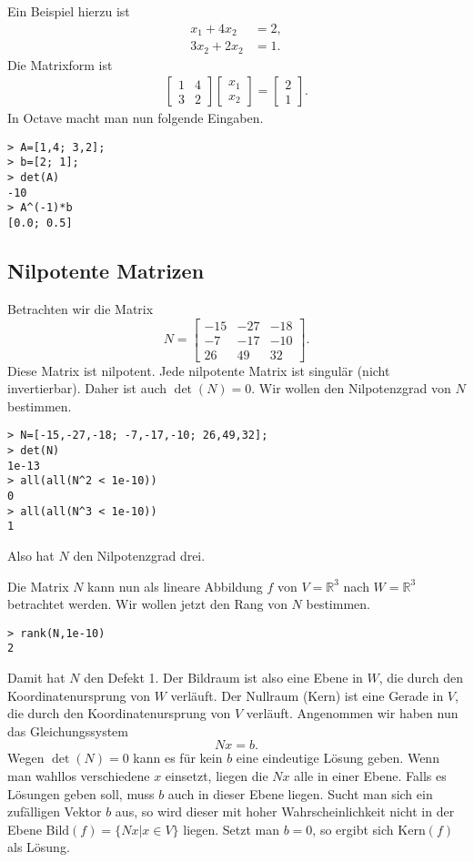 \documentclass[a4paper,11pt,fleqn,twocolumn,twoside,dvipdfmx]{scrartcl}
\begin{document}
Ein Beispiel hierzu ist
\begin{align*}
x_1+4x_2 &= 2,\\
3x_2+2x_2 &=1.
\end{align*}
Die Matrixform ist
\begin{gather*}
\begin{bmatrix}
1 & 4\\
3 & 2
\end{bmatrix}
\begin{bmatrix}
x_1\\ x_2
\end{bmatrix}
= \begin{bmatrix}
2\\ 1
\end{bmatrix}.
\end{gather*}
In Octave macht man nun folgende Eingaben.
\begin{verbatim}
> A=[1,4; 3,2];
> b=[2; 1];
> det(A)
-10
> A^(-1)*b
[0.0; 0.5]
\end{verbatim}

\subsection{Nilpotente Matrizen}

Betrachten wir die Matrix
\[N=\begin{bmatrix}
-15 & -27 & -18\\
 -7 & -17 & -10\\
 26 &  49 &  32
\end{bmatrix}.\]
Diese Matrix ist nilpotent. Jede nilpotente Matrix ist singulär
(nicht invertierbar). Daher ist auch $\det(N)=0$. Wir wollen
den Nilpotenzgrad von $N$ bestimmen.
\begin{verbatim}
> N=[-15,-27,-18; -7,-17,-10; 26,49,32];
> det(N)
1e-13
> all(all(N^2 < 1e-10))
0
> all(all(N^3 < 1e-10))
1
\end{verbatim}
Also hat $N$ den Nilpotenzgrad drei.

Die Matrix $N$ kann nun als lineare Abbildung $f$ von
$V=\mathbb R^3$ nach $W=\mathbb R^3$ betrachtet werden. Wir
wollen jetzt den Rang von $N$ bestimmen.
\begin{verbatim}
> rank(N,1e-10)
2
\end{verbatim}
Damit hat $N$ den Defekt 1. Der Bildraum ist also eine Ebene in
$W$, die durch den Koordinatenursprung von $W$ verläuft. Der
Nullraum (Kern) ist eine Gerade in $V$, die durch den
Koordinatenursprung von $V$ verläuft. Angenommen wir haben nun das
Gleichungssystem
\[Nx=b.\]
Wegen $\det(N)=0$ kann es für kein $b$ eine eindeutige Lösung
geben. Wenn man wahllos verschiedene $x$ einsetzt, liegen die
$Nx$ alle in einer Ebene. Falls es Lösungen geben soll, muss
$b$ auch in dieser Ebene liegen. Sucht man sich ein zufälligen
Vektor $b$ aus, so wird dieser mit hoher Wahrscheinlichkeit nicht
in der Ebene $\mathrm{Bild}(f)=\{Nx|x\in V\}$ liegen. Setzt man
$b=0$, so ergibt sich $\mathrm{Kern}(f)$ als Lösung. 
\end{document}
